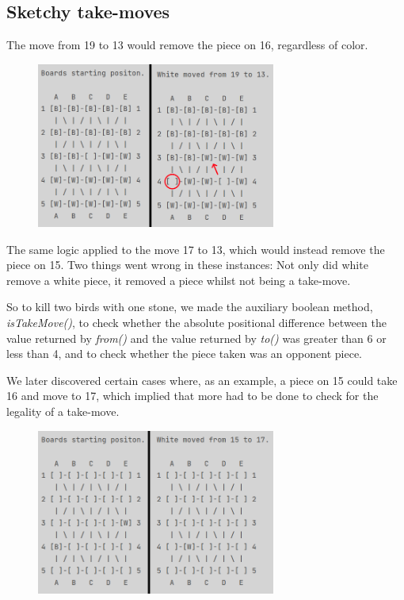 \documentclass[12pt, a4paper]{article}
\begin{document}
\subsection{Sketchy take-moves}

The move from 19 to 13 would remove the piece on 16, regardless of color. \par

\begin{figure}[h]
	\centering
	\includegraphics[width=0.7\textwidth]{19til13TakeFejl.png}	
\end{figure}

The same logic applied to the move 17 to 13, which would instead remove the piece on 15. 
Two things went wrong in these instances: Not only did white remove a white piece, it removed a piece whilst not being a take-move. \par So to kill two birds with one stone, we made the auxiliary boolean method, \emph{isTakeMove()}, to check whether the absolute positional difference between the value returned by \emph{from()} and the value returned by \emph{to()} was greater than 6 or less than 4, and to check whether the piece taken was an opponent piece. \par 
We later discovered certain cases where, as an example, a piece on 15 could take 16 and move to 17, which implied that more had to be done to check for the legality of a take-move. \par

\begin{figure}[h]
	\centering
	\includegraphics[width=0.7\textwidth]{15til17TakeFejl.png}	
\end{figure}
\end{document}
